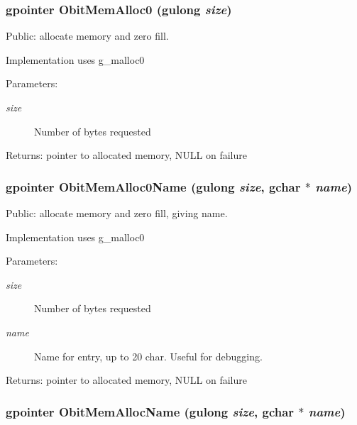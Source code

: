 \subsubsection{\setlength{\rightskip}{0pt plus 5cm}gpointer Obit\-Mem\-Alloc0 (gulong {\em size})}\label{ObitMem_8h_a2}


Public: allocate memory and zero fill. 

Implementation uses g\_\-malloc0 \begin{Desc}
\item[Parameters:]
\begin{description}
\item[{\em size}]Number of bytes requested \end{description}
\end{Desc}
\begin{Desc}
\item[Returns:]pointer to allocated memory, NULL on failure \end{Desc}
\subsubsection{\setlength{\rightskip}{0pt plus 5cm}gpointer Obit\-Mem\-Alloc0Name (gulong {\em size}, gchar $\ast$ {\em name})}\label{ObitMem_8h_a4}


Public: allocate memory and zero fill, giving name. 

Implementation uses g\_\-malloc0 \begin{Desc}
\item[Parameters:]
\begin{description}
\item[{\em size}]Number of bytes requested \item[{\em name}]Name for entry, up to 20 char. Useful for debugging. \end{description}
\end{Desc}
\begin{Desc}
\item[Returns:]pointer to allocated memory, NULL on failure \end{Desc}
\subsubsection{\setlength{\rightskip}{0pt plus 5cm}gpointer Obit\-Mem\-Alloc\-Name (gulong {\em size}, gchar $\ast$ {\em name})}\label{ObitMem_8h_a3}


